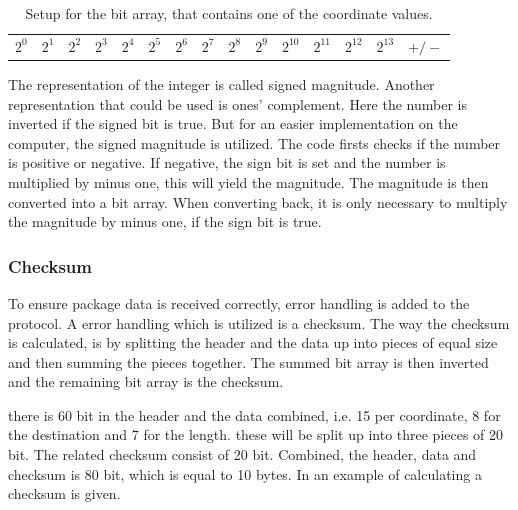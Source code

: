\begin{table}[H]
\centering
\begin{tabular}{|>{\centering\arraybackslash}m{0.5cm}|>{\centering\arraybackslash}m{0.5cm}|>{\centering\arraybackslash}m{0.5cm}|>{\centering\arraybackslash}m{0.5cm}|>{\centering\arraybackslash}m{0.5cm}|>{\centering\arraybackslash}m{0.5cm}|>{\centering\arraybackslash}m{0.5cm}|>{\centering\arraybackslash}m{0.5cm}|>{\centering\arraybackslash}m{0.5cm}|>{\centering\arraybackslash}m{0.5cm}|>{\centering\arraybackslash}m{0.5cm}|>{\centering\arraybackslash}m{0.5cm}|>{\centering\arraybackslash}m{0.5cm}|>{\centering\arraybackslash}m{0.5cm}|>{\centering\arraybackslash}m{0.65cm}|}
\multicolumn{15}{c}{15 bits} \\
\hline
$2^0$ & $2^1$ & $2^2$ & $2^3$ & $2^4$ & $2^5$ & $2^6$ & $2^7$ & $2^8$ & $2^9$ & $2^{10}$ & $2^{11}$ & $2^{12}$ & $2^{13}$ & $+/-$ \\
\hline
\end{tabular}
\caption{Setup for the bit array, that contains one of the coordinate values.}
\label{CoorSetup}
\end{table}

The representation of the integer is called signed magnitude. Another representation that could be used is ones' complement. Here the number is inverted if the signed bit is true. But for an easier implementation on the computer, the signed magnitude is utilized. The code firsts checks if the number is positive or negative. If negative, the sign bit is set and the number is multiplied by minus one, this will yield the magnitude. The magnitude is then converted into a bit array. When converting back, it is only necessary to multiply the magnitude by minus one, if the sign bit is true.

\subsubsection{Checksum}
To ensure package data is received correctly, error handling is added to the protocol. A error handling which is utilized is a checksum. The way the checksum is calculated, is by splitting the header and the data up into pieces of equal size and then summing the pieces together. The summed bit array is then inverted and the remaining bit array is the checksum. 

there is 60 bit in the header and the data combined, i.e. 15 per coordinate, 8 for the destination and 7 for the length. these will be split up into three pieces of 20 bit. The related checksum consist of 20 bit. Combined, the header, data and checksum is 80 bit, which is equal to 10 bytes. In  an example of calculating a checksum is given.

